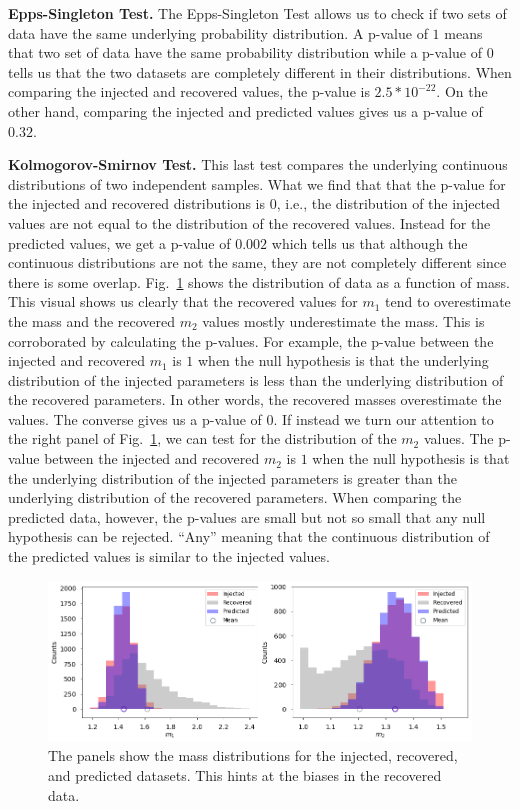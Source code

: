 \documentclass[aps,prd,twocolumn,superscriptaddress,preprintnumbers,floatfix,nofootinbib]{revtex4-2}
\begin{document}
\textbf{Epps-Singleton Test.} The Epps-Singleton Test allows us to check if two 
sets of data have the same underlying probability distribution. A p-value of $1$ means 
that two set of data have the same probability distribution while a p-value of $0$ tells us 
that the two datasets are completely different in their distributions. When comparing the 
injected and recovered values, the p-value is $2.5*10^{-22}$. On the other hand, comparing 
the injected and predicted values gives us a p-value of $0.32$. 

\textbf{Kolmogorov-Smirnov Test.} This last test compares the underlying continuous 
distributions of two independent samples. What we find that that the p-value for the 
injected and recovered distributions is $0$, i.e., the distribution of the injected values are 
not equal to the distribution of the recovered values. Instead for the predicted values, we get 
a p-value of $0.002$ which tells us that although the continuous distributions are not the 
same, they are not completely different since there is some overlap. Fig.~\ref{fig:ks_test} 
shows the distribution of data as a function of mass. This visual shows us clearly that the 
recovered values for $m_1$ tend to overestimate the mass and the recovered $m_2$ 
values mostly underestimate the mass. This is corroborated by calculating the p-values. 
For example, the p-value between the injected and recovered $m_1$ is $1$ when the 
null hypothesis is that the underlying distribution of the injected parameters is less than 
the underlying distribution of the recovered parameters. In other words, the recovered 
masses overestimate the values. The converse gives us a p-value of $0$. If instead we turn 
our attention to the right panel of Fig.~\ref{fig:ks_test}, we can test for the distribution of 
the $m_2$ values. The p-value between the injected and recovered $m_2$ is $1$ when the 
null hypothesis is that the underlying distribution of the injected parameters is greater than 
the underlying distribution of the recovered parameters. When comparing the predicted data, 
however, the p-values are small but not so small that any null hypothesis can be rejected. 
``Any'' meaning that the continuous distribution of the predicted values is similar to the 
injected values.
\begin{figure}[t]
  \centering
  \includegraphics[width=\linewidth]{KS_test.png}
  \caption{The panels show the mass distributions for the injected, recovered, and predicted 
  		datasets. This hints at the biases in the recovered data.}
  \label{fig:ks_test}
\end{figure}
\end{document}
